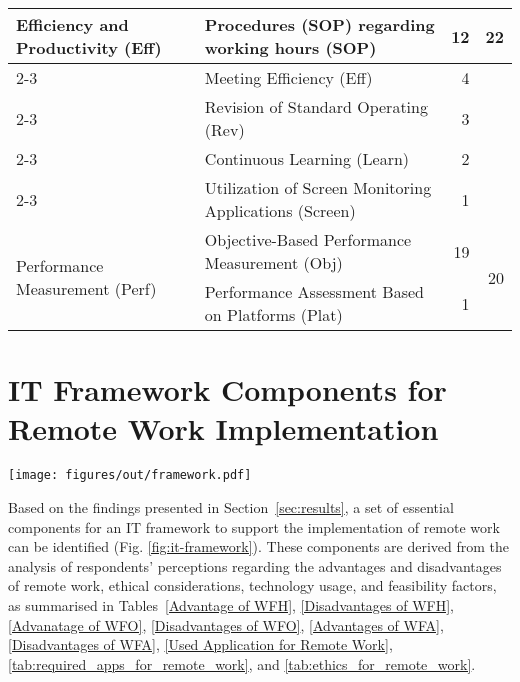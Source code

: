 \documentclass[a4paper, conference]{IEEEtran}
\begin{document}
\begin{table}
\begin{tabular}{|p{}|p{}|r|r|}
		\multirow{5}{=}{Efficiency and Productivity (Eff)}    
		& Procedures (SOP) regarding working hours (SOP) & 12 & \multirow{5}{*}{22} \\ \cline{2-3}
		& Meeting Efficiency (Eff) & 4 & \\ \cline{2-3}
		& Revision of Standard Operating (Rev) & 3 & \\ \cline{2-3}
		& Continuous Learning (Learn) & 2 & \\ \cline{2-3}
		& Utilization of Screen Monitoring Applications (Screen) & 1 & \\ \hline
		
		\multirow{2}{=}{Performance Measurement (Perf)} 
		& Objective-Based Performance Measurement (Obj) & 19 & \multirow{2}{*}{20} \\ \cline{2-3}
		& Performance Assessment Based on Platforms (Plat) & 1 & \\ \hline
	\end{tabular}
\end{table}


\section{IT Framework Components for Remote Work Implementation}
\label{sec:it-framework}

\begin{figure*}[ht]
	\centering
	\texttt{[image: figures/out/framework.pdf]}
	\caption{IT Framework Components for Remote Work Implementation}
	\label{fig:it-framework}
\end{figure*}

Based on the findings presented in Section~\ref{sec:results}, a set of essential components for an IT framework to support the implementation of remote work can be identified (Fig. \ref{fig:it-framework}). These components are derived from the analysis of respondents' perceptions regarding the advantages and disadvantages of remote work, ethical considerations, technology usage, and feasibility factors, as summarised in Tables~\ref{Advantage of WFH}, \ref{Disadvantages of WFH}, \ref{Advanatage of WFO}, \ref{Disadvantages of WFO}, \ref{Advantages of WFA}, \ref{Disadvantages of WFA}, \ref{Used Application for Remote Work}, \ref{tab:required_apps_for_remote_work}, and \ref{tab:ethics_for_remote_work}.
\end{document}
